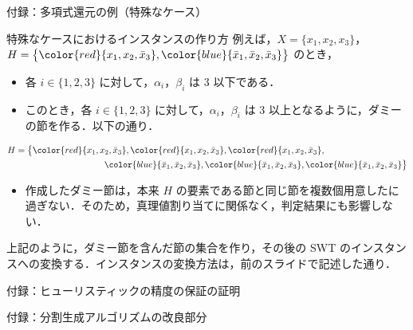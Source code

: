 \documentclass[dvipdfmx]{beamer}
\begin{document}
    \begin{frame}{付録：多項式還元の例（特殊なケース）}
      \begin{block}{特殊なケースにおけるインスタンスの作り方}
        例えば，$X = \{x_1,x_2,x_3\}$，$H = \big\{{\color{red}\{x_1,x_2,\bar x_3\}},{\color{blue}\{\bar x_1, \bar x_2, \bar x_3\}}\big\}$ のとき，
        \begin{itemize}
          \item
          各 $i \in \{1,2,3\}$ に対して，$\alpha_i$，$\beta_i$ は 3 以下である．
          \item
          このとき，各 $i \in \{1,2,3\}$ に対して，$\alpha_i$，$\beta_i$ は 3 以上となるように，ダミーの節を作る．以下の通り．
        \end{itemize}
        \begin{equation}
          \begin{split}
            H &= \big\{
            {\color{red}\{x_1,x_2,\bar x_3\}},
            {\color{red}\{x_1,x_2,\bar x_3\}},
            {\color{red}\{x_1,x_2,\bar x_3\}},
            \\ & \qquad\qquad\qquad\qquad\qquad
            {\color{blue}\{\bar x_1, \bar x_2, \bar x_3\}},
            {\color{blue}\{\bar x_1, \bar x_2, \bar x_3\}},
            {\color{blue}\{\bar x_1, \bar x_2, \bar x_3\}}
            \big\} \notag
          \end{split}
        \end{equation}
        \begin{itemize}
          \item 作成したダミー節は，本来 $H$ の要素である節と同じ節を複数個用意したに過ぎない．そのため，真理値割り当てに関係なく，判定結果にも影響しない．
        \end{itemize}
        上記のように，ダミー節を含んだ節の集合を作り，その後の SWT のインスタンスへの変換する．インスタンスの変換方法は，前のスライドで記述した通り．
      \end{block}
    \end{frame}

    \begin{frame}{付録：ヒューリスティックの精度の保証の証明}

    \end{frame}

    \begin{frame}{付録：分割生成アルゴリズムの改良部分}

    \end{frame}
\end{document}
